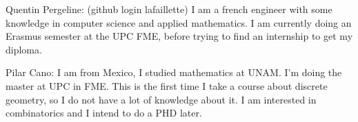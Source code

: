 Quentin Pergeline:
(github login lafaillette) I am a french engineer with some knowledge in computer science and applied mathematics.
I am currently doing an Erasmus semester at the UPC FME, before trying to find an internship to get my diploma.

Pilar Cano:
I am from Mexico, I studied mathematics at UNAM. I'm doing the master at UPC in FME. This is the first time I take a course about discrete geometry, so I do not have a lot of knowledge about it. I am interested in combinatorics and I intend to do a PHD later.
